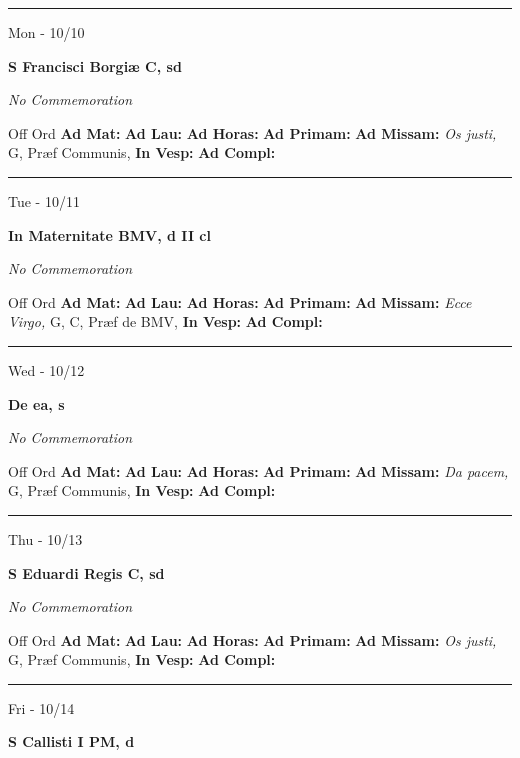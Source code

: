 \documentclass[letterpaper, 10pt]{article}
\begin{document}
\hrule
\begin{center}
Mon - 10/10
\end{center}\textbf{ \large S Francisci Borgiæ C, \textnormal{\normalsize sd}}

\textit{No Commemoration}\begin{justify}
Off Ord
\textbf{Ad Mat: }
\textbf{Ad Lau: }
\textbf{Ad Horas: }
\textbf{Ad Primam: }
\textbf{Ad Missam:} \textit{Os justi, } G, Præf Communis, 
\textbf{In Vesp: }
\textbf{Ad Compl: }\end{justify}



\hrule
\begin{center}
Tue - 10/11
\end{center}\textbf{ \large In Maternitate BMV, \textnormal{\normalsize d II cl}}

\textit{No Commemoration}\begin{justify}
Off Ord
\textbf{Ad Mat: }
\textbf{Ad Lau: }
\textbf{Ad Horas: }
\textbf{Ad Primam: }
\textbf{Ad Missam:} \textit{Ecce Virgo, } G, C, Præf de BMV, 
\textbf{In Vesp: }
\textbf{Ad Compl: }\end{justify}



\hrule
\begin{center}
Wed - 10/12
\end{center}\textbf{ \large De ea, \textnormal{\normalsize s}}

\textit{No Commemoration}\begin{justify}
Off Ord
\textbf{Ad Mat: }
\textbf{Ad Lau: }
\textbf{Ad Horas: }
\textbf{Ad Primam: }
\textbf{Ad Missam:} \textit{Da pacem, } G, Præf Communis, 
\textbf{In Vesp: }
\textbf{Ad Compl: }\end{justify}



\hrule
\begin{center}
Thu - 10/13
\end{center}\textbf{ \large S Eduardi Regis C, \textnormal{\normalsize sd}}

\textit{No Commemoration}\begin{justify}
Off Ord
\textbf{Ad Mat: }
\textbf{Ad Lau: }
\textbf{Ad Horas: }
\textbf{Ad Primam: }
\textbf{Ad Missam:} \textit{Os justi, } G, Præf Communis, 
\textbf{In Vesp: }
\textbf{Ad Compl: }\end{justify}



\hrule
\begin{center}
Fri - 10/14
\end{center}\textbf{ \large S Callisti I PM, \textnormal{\normalsize d}}
\end{document}

